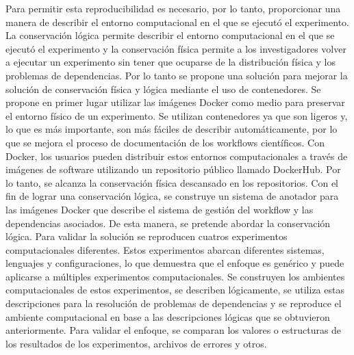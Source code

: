 Para permitir esta reproducibilidad es necesario, por lo tanto, proporcionar una manera de describir el entorno computacional en el que se ejecutó el experimento. La conservación lógica permite describir el entorno computacional en el que se ejecutó el experimento y la conservación física permite a los investigadores volver a ejecutar un experimento sin tener que ocuparse de la distribución física y los problemas de dependencias.
Por lo tanto se propone una solución para mejorar la solución de conservación física y lógica mediante el uso de contenedores.
Se propone en primer lugar utilizar las imágenes Docker como medio para preservar el entorno físico de un experimento. Se utilizan contenedores ya que son ligeros y, lo que es más importante, son más fáciles de describir automáticamente, por lo que se mejora el proceso de documentación de los workflows científicos.
Con Docker, los usuarios pueden distribuir estos entornos computacionales a través de imágenes de software utilizando un repositorio público llamado DockerHub. Por lo tanto, se alcanza la conservación física descansado en los repositorios.
Con el fin de lograr una conservación lógica, se construye un sistema de anotador para las imágenes Docker que describe el sistema de gestión del workflow y las dependencias asociados. De esta manera, se pretende abordar la conservación lógica.
Para validar la solución se reproducen cuatros experimentos computacionales diferentes. Estos experimentos abarcan diferentes sistemas, lenguajes y configuraciones, lo que demuestra que el enfoque es genérico y puede aplicarse a múltiples experimentos computacionales.
Se construyen los ambientes computacionales de estos experimentos, se describen lógicamente, se utiliza estas descripciones para la resolución de problemas de dependencias y se reproduce el ambiente computacional en base a las descripciones lógicas que se obtuvieron anteriormente.
Para validar el enfoque, se comparan los valores o estructuras de los resultados de los experimentos, archivos de errores y otros.